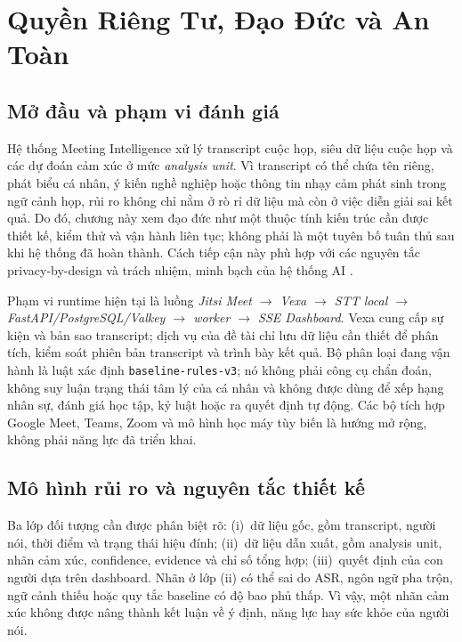 \chapter{Quyền Riêng Tư, Đạo Đức và An Toàn}
\label{chap:ethics}

\section{Mở đầu và phạm vi đánh giá}
Hệ thống Meeting Intelligence xử lý transcript cuộc họp, siêu dữ liệu cuộc họp và các dự đoán cảm xúc ở mức \emph{analysis unit}. Vì transcript có thể chứa tên riêng, phát biểu cá nhân, ý kiến nghề nghiệp hoặc thông tin nhạy cảm phát sinh trong ngữ cảnh họp, rủi ro không chỉ nằm ở rò rỉ dữ liệu mà còn ở việc diễn giải sai kết quả. Do đó, chương này xem đạo đức như một thuộc tính kiến trúc cần được thiết kế, kiểm thử và vận hành liên tục; không phải là một tuyên bố tuân thủ sau khi hệ thống đã hoàn thành. Cách tiếp cận này phù hợp với các nguyên tắc privacy-by-design \cite{cavoukian2011} và trách nhiệm, minh bạch của hệ thống AI \cite{oecdai2024}.

Phạm vi runtime hiện tại là luồng \emph{Jitsi Meet $\rightarrow$ Vexa $\rightarrow$ STT local $\rightarrow$ FastAPI/PostgreSQL/Valkey $\rightarrow$ worker $\rightarrow$ SSE Dashboard}. Vexa cung cấp sự kiện và bản sao transcript; dịch vụ của đề tài chỉ lưu dữ liệu cần thiết để phân tích, kiểm soát phiên bản transcript và trình bày kết quả. Bộ phân loại đang vận hành là luật xác định \texttt{baseline-rules-v3}; nó không phải công cụ chẩn đoán, không suy luận trạng thái tâm lý của cá nhân và không được dùng để xếp hạng nhân sự, đánh giá học tập, kỷ luật hoặc ra quyết định tự động. Các bộ tích hợp Google Meet, Teams, Zoom và mô hình học máy tùy biến là hướng mở rộng, không phải năng lực đã triển khai.

\section{Mô hình rủi ro và nguyên tắc thiết kế}
Ba lớp đối tượng cần được phân biệt rõ: (i)~dữ liệu gốc, gồm transcript, người nói, thời điểm và trạng thái hiệu đính; (ii)~dữ liệu dẫn xuất, gồm analysis unit, nhãn cảm xúc, confidence, evidence và chỉ số tổng hợp; (iii)~quyết định của con người dựa trên dashboard. Nhãn ở lớp (ii) có thể sai do ASR, ngôn ngữ pha trộn, ngữ cảnh thiếu hoặc quy tắc baseline có độ bao phủ thấp. Vì vậy, một nhãn cảm xúc không được nâng thành kết luận về ý định, năng lực hay sức khỏe của người nói.

